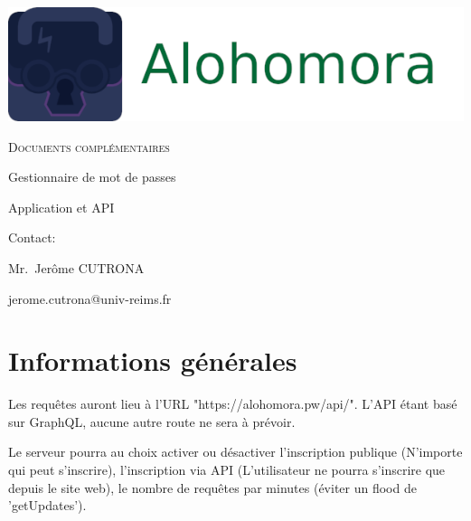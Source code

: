 \documentclass[oneside]{report}
\author{Sylvain COMBRAQUE, Sarah LAMOTTE, Nathan JANCZEWSKI, Léo BERGEROT}
\begin{document}
	\begin{titlepage}
		\centering
		\includegraphics[scale=.5]{logo_large}
		\vspace{5cm}
		{\par\scshape\Huge Documents complémentaires\par}
		\vspace{5cm}
		{\par Gestionnaire de mot de passes\par}
		{\par Application et API\par}
		\vfill
		\par Contact:
		{\par\small Mr.\ Jerôme CUTRONA \par}
		\par jerome.cutrona@univ-reims.fr\
	\end{titlepage}

	\pagestyle{fancy}
	\fancyhf{}
	\tableofcontents

	\chapter{Informations générales}
	\vspace{2cm}
	\par Les requêtes auront lieu à l'URL "https://alohomora.pw/api/". L'API étant basé sur GraphQL, aucune autre route ne sera à prévoir.
	\par Le serveur pourra au choix activer ou désactiver l'inscription publique (N'importe qui peut s'inscrire), l'inscription via API (L'utilisateur ne pourra s'inscrire que depuis le site web), le nombre de requêtes par minutes (éviter un flood de 'getUpdates').
\end{document}
